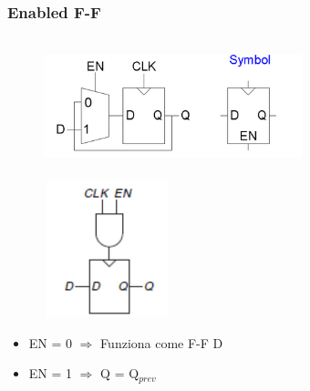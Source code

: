 \documentclass{report}
\begin{document}
        \subsubsection{Enabled F-F}
            \begin{center}
                \begin{figure}[H]
                    \includegraphics[width=0.67\textwidth, height=4cm]{flipflope.png}
                    \includegraphics[width=0.33\textwidth, height=4cm]{flipflope2.png}
                \end{figure}
            \end{center}
            \begin{itemize}
                \item EN = 0 $\Longrightarrow$ Funziona come F-F D
                \item EN = 1 $\Longrightarrow$ Q = Q$_{prev}$
            \end{itemize}
\end{document}
